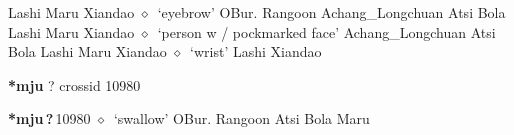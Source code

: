 \begin{list}{}{\leftmargin=1.5em \itemindent=-1.5em}
\hspace{1ex}
         Lashi 
\hspace{1ex}
         Maru 
\hspace{1ex}
         Xiandao 
\hspace{1ex}
         $\diamond$~`eyebrow'
         OBur. 
\hspace{1ex}
         Rangoon 
\hspace{1ex}
         Achang\_Longchuan 
\hspace{1ex}
         Atsi 
\hspace{1ex}
         Bola 
\hspace{1ex}
         Lashi 
\hspace{1ex}
         Maru 
\hspace{1ex}
         Xiandao 
\hspace{1ex}
         $\diamond$~`person w / pockmarked face'
         Achang\_Longchuan 
\hspace{1ex}
         Atsi 
\hspace{1ex}
         Bola 
\hspace{1ex}
         Lashi 
\hspace{1ex}
         Maru 
\hspace{1ex}
         Xiandao 
\hspace{1ex}
         $\diamond$~`wrist'
         Lashi 
\hspace{1ex}
         Xiandao 
  \end{list}
\item
\textbf{*mju}
?
  {\tiny crossid 10980}
  \begin{list}{}{\leftmargin=1.5em \itemindent=-1.5em}
  \item {\footnotesize \textbf{*mju\,?\,}}{\tiny 10980}
         $\diamond$~`swallow'
         OBur. 
\hspace{1ex}
         Rangoon 
\hspace{1ex}
         Atsi 
\hspace{1ex}
         Bola 
\hspace{1ex}
         Maru 
  \end{list}
